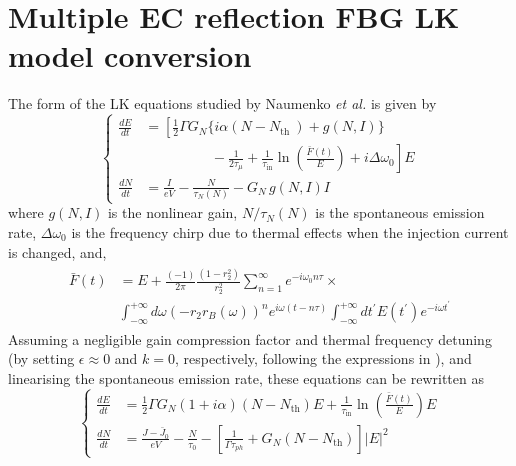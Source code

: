 \section{Multiple EC reflection FBG LK model conversion}
\label{sec:multiple_EC_nondim}
%
The form of the LK equations studied by Naumenko \textit{et al.} \cite{naumenko2003characteristics,naumenko2004slow} is given by
\begin{equation}
\left\{
\begin{aligned}
\frac{d E}{d t} &= \left[\frac{1}{2} \Gamma G_N \big\{ i \alpha\left(N-N_{\text {th }}\right)+g(N, I) \big\} \right. \\
                &\left.\hspace{2cm} - \frac{1}{2 \tau_\mu}+\frac{1}{\tau_\text{in}} \ln \left(\frac{\bar{F}(t)}{E}\right)+i \Delta \omega_0\right] E\\
\frac{d N}{d t} &= \frac{I}{e V}-\frac{N}{\tau_N(N)}-G_N \, g(N, I) I
\end{aligned}
\right.
\end{equation}
%
where $g(N, I)$ is the nonlinear gain, $N / \tau_N(N)$ is the spontaneous emission rate, $\Delta \omega_0$ is the frequency chirp due to thermal effects when the injection current is changed, and,
%
\begin{gather}
\begin{aligned}
\bar{F}(t) &=  E+\frac{(-1)}{2 \pi} \frac{\left(1-r_2^2\right)}{r_2^2} \sum_{n=1}^{\infty} e^{-i \omega_0 n \tau} \times \\
            &\int_{-\infty}^{+\infty} d \omega\left(-r_2 r_B(\omega)\right)^n e^{i \omega(t-n \tau)} \int_{-\infty}^{+\infty} d t^{\prime} E\left(t^{\prime}\right) e^{-i \omega t^{\prime}}
\end{aligned}
\end{gather}
%
Assuming a negligible gain compression factor and thermal frequency detuning (by setting $\epsilon \approx 0$ and $k=0$, respectively, following the expressions in \cite{naumenko2003characteristics}), and linearising the spontaneous emission rate, these equations can be rewritten as
%
\begin{equation*}
\left\{\begin{aligned}
\frac{d E}{d t} &= \frac{1}{2} \Gamma G_N(1+i \alpha)\left(N-N_\text{th}\right) E + \frac{1}{\tau_\text{in}} \ln \left(\frac{\bar{F}(t)}{E}\right) E 
\\
\frac{d N}{d t} &= \frac{J-\bar{J}_0}{e V}-\frac{N}{\tau_0}-\left[\frac{1}{\Gamma \tau_{p h}} + G_N\left(N-N_\text{th}\right)\right]|E|^2
\end{aligned}\right.
\end{equation*}
